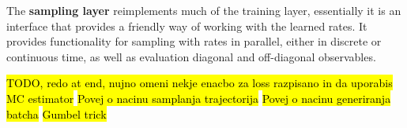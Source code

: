 The \textbf{sampling layer} reimplements much of the training layer, essentially it is an interface that provides a friendly way of working with the learned rates. It provides functionality for sampling with rates in parallel, either in discrete or continuous time, as well as evaluation diagonal and off-diagonal observables. 

\hl{TODO, redo at end, nujno omeni nekje enacbo za loss razpisano in da uporabis MC estimator}
\hl{Povej o nacinu samplanja trajectorija}
\hl{Povej o nacinu generiranja batcha}
\hl{Gumbel trick}